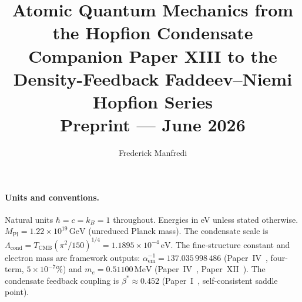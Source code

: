 \documentclass[11pt,a4paper]{article}
\title{\textbf{Atomic Quantum Mechanics from the Hopfion Condensate}
\\[0.6em]
{\large Companion Paper XIII to the Density-Feedback
Faddeev--Niemi Hopfion Series}
\\[0.6em]
\large Preprint --- June 2026}
\author{Frederick Manfredi}
\date{}
\theoremstyle{definition}
\theoremstyle{remark}
\newcommand{\bst}{\beta^{*}}
\newcommand{\TCMB}{T_{\mathrm{CMB}}}
\newcommand{\Lcond}{\Lambda_{\mathrm{cond}}}
\newcommand{\MPl}{M_{\mathrm{Pl}}}
\newcommand{\aem}{\alpha_{\mathrm{em}}}
\begin{document}
\maketitle

\paragraph*{Units and conventions.}
Natural units $\hbar = c = k_B = 1$ throughout.
Energies in eV unless stated otherwise.
$\MPl = 1.22\times10^{19}\,\mathrm{GeV}$ (unreduced Planck mass).
The condensate scale is
$\Lcond = \TCMB(\pi^2/150)^{1/4} = 1.1895\times10^{-4}\,\mathrm{eV}$.
The fine-structure constant and electron mass are framework outputs:
$\aem^{-1} = 137.035\,998\,486$ (Paper~IV~\cite{Paper4}, four-term,
$5\times10^{-7}\%$) and
$m_e = 0.51100\,\mathrm{MeV}$
(Paper~IV~\cite{Paper4}, Paper~XII~\cite{Paper12}).
The condensate feedback coupling is $\bst\approx0.452$
(Paper~I~\cite{Paper1}, self-consistent saddle point).
\end{document}
